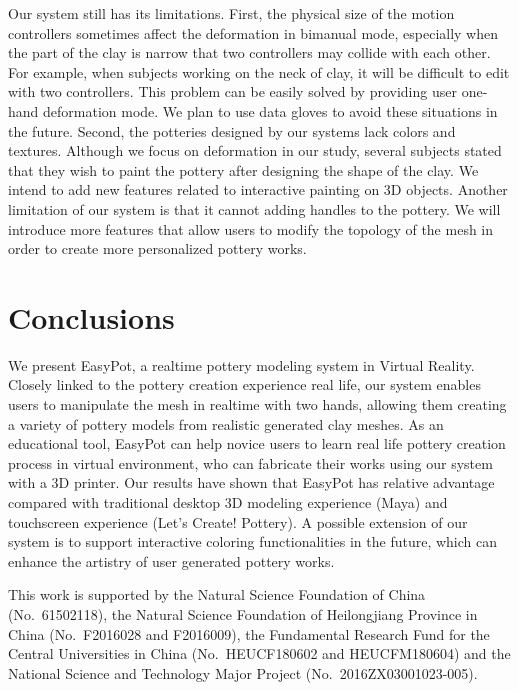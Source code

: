 \documentclass{svjour3}                     %
\begin{document}
Our system still has its limitations. First, the physical size of the motion controllers sometimes affect the deformation in bimanual mode, especially when the part of the clay is narrow that two controllers may collide with each other. For example, when subjects working on the neck of clay, it will be difficult to edit with two controllers. This problem can be easily solved by providing user one-hand deformation mode. We plan to use data gloves to avoid these situations in the future.
%
Second, the potteries designed by our systems lack colors and textures. Although we focus on deformation in our study, several subjects stated that they wish to paint the pottery after designing the shape of the clay. We intend to add new features related to interactive painting on 3D objects.
%
Another limitation of our system is that it cannot adding handles to the pottery. We will introduce more features that allow users to modify the topology of the mesh in order to create more personalized pottery works.


\section{Conclusions}
\label{sec:8}

We present EasyPot, a realtime pottery modeling system in Virtual Reality.
Closely linked to the pottery creation experience real life, our system enables users to manipulate the mesh in realtime with two hands, allowing them creating a variety of pottery models from realistic generated clay meshes.
As an educational tool, EasyPot can help novice users to learn real life pottery creation process in virtual environment, who can fabricate their works using our system with a 3D printer.
Our results have shown that EasyPot has relative advantage compared with traditional desktop 3D modeling experience (Maya) and touchscreen experience (Let's Create! Pottery).
A possible extension of our system is to support interactive coloring functionalities in the future, which can enhance the artistry of user generated pottery works.


\begin{acknowledgements}
This work is supported by the Natural Science Foundation of China (No.~61502118), the Natural Science Foundation of Heilongjiang Province in China (No.~F2016028 and F2016009), the Fundamental Research Fund for the Central Universities in China (No.~HEUCF180602 and HEUCFM180604) and the National Science and Technology Major Project (No.~2016ZX03001023-005).
\end{acknowledgements}
\end{document}
